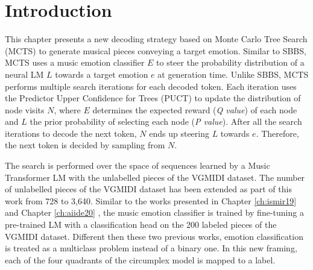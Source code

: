 \section{Introduction}


This chapter presents a new decoding strategy based on Monte Carlo Tree Search (MCTS) to generate musical pieces conveying a target emotion. Similar to SBBS, MCTS uses a music emotion classifier $E$ to steer the probability distribution of a neural LM $L$ towards a target emotion $e$ at generation time. Unlike SBBS, MCTS performs multiple search iterations for each decoded token. Each iteration uses the Predictor Upper Confidence for Trees (PUCT) to update the distribution of node visits $N$, where $E$ determines the expected reward (\textit{Q value}) of each node and $L$ the prior probability of selecting each node (\textit{P value}). After all the search iterations to decode the next token, $N$ ends up steering $L$ towards $e$. Therefore, the next token is decided by sampling from $N$.

The search is performed over the space of sequences learned by a Music Transformer LM \cite {huang2018music} with the unlabelled pieces of the VGMIDI dataset. The number of unlabelled pieces of the VGMIDI dataset has been extended as part of this work from 728 to 3,640. Similar to the works presented in Chapter \ref{ch:ismir19} \cite{ferreira_2019} and Chapter \ref{ch:aiide20} \cite{ferreira2020computer}, the music emotion classifier is trained by fine-tuning a pre-trained LM with a classification head on the 200 labeled pieces of the VGMIDI dataset. Different then these two previous works, emotion classification is treated as a multiclass problem instead of a binary one. In this new framing, each of the four quadrants of the circumplex model is mapped to a label.

